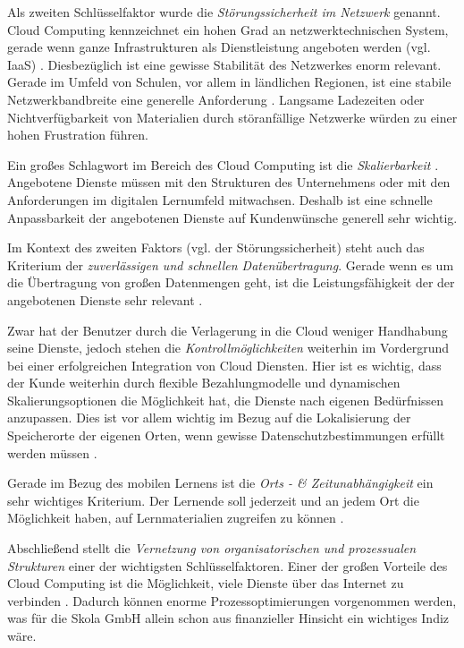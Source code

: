 Als zweiten Schlüsselfaktor wurde die \textit{Störungssicherheit im Netzwerk} genannt. Cloud Computing kennzeichnet ein hohen Grad an netzwerktechnischen System, gerade wenn ganze Infrastrukturen als Dienstleistung angeboten werden (vgl. IaaS) \cite{krcmar}. Diesbezüglich ist eine gewisse Stabilität des Netzwerkes enorm relevant. Gerade im Umfeld von Schulen, vor allem in ländlichen Regionen, ist eine stabile Netzwerkbandbreite eine generelle Anforderung \cite{gebauer}. Langsame Ladezeiten oder Nichtverfügbarkeit von Materialien durch störanfällige Netzwerke würden zu einer hohen Frustration führen.

Ein großes Schlagwort im Bereich des Cloud Computing ist die \textit{Skalierbarkeit} \cite{renz}. Angebotene Dienste müssen mit den Strukturen des Unternehmens oder mit den Anforderungen im digitalen Lernumfeld mitwachsen. Deshalb ist eine schnelle Anpassbarkeit der angebotenen Dienste auf Kundenwünsche generell sehr wichtig.

Im Kontext des zweiten Faktors (vgl. der Störungssicherheit) steht auch das Kriterium der \textit{zuverlässigen und schnellen Datenübertragung}. Gerade wenn es um die Übertragung von großen Datenmengen geht, ist die Leistungsfähigkeit der der angebotenen Dienste sehr relevant \cite{gebauer}.

Zwar hat der Benutzer durch die Verlagerung in die Cloud weniger Handhabung seine Dienste, jedoch stehen die \textit{Kontrollmöglichkeiten} weiterhin im Vordergrund bei einer erfolgreichen Integration von Cloud Diensten. Hier ist es wichtig, dass der Kunde weiterhin durch flexible Bezahlungmodelle und dynamischen Skalierungsoptionen die Möglichkeit hat, die Dienste nach eigenen Bedürfnissen anzupassen. Dies ist vor allem wichtig im Bezug auf die Lokalisierung der Speicherorte der eigenen Orten, wenn gewisse Datenschutzbestimmungen erfüllt werden müssen \cite{gebauer}.

Gerade im Bezug des mobilen Lernens ist die \textit{Orts - \& Zeitunabhängigkeit} ein sehr wichtiges Kriterium. Der Lernende soll jederzeit und an jedem Ort die Möglichkeit haben, auf Lernmaterialien zugreifen zu können \cite{grella}.

Abschließend stellt die \textit{Vernetzung von organisatorischen und prozessualen Strukturen} einer der wichtigsten Schlüsselfaktoren. Einer der großen Vorteile des Cloud Computing ist die Möglichkeit, viele Dienste über das Internet zu verbinden \cite{krcmar}. Dadurch können enorme Prozessoptimierungen vorgenommen werden, was für die Skola GmbH allein schon aus finanzieller Hinsicht ein wichtiges Indiz wäre.
